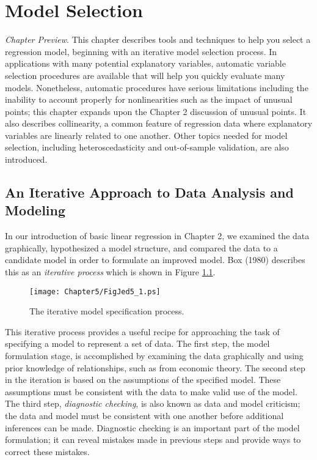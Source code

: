 \setcounter{chapter}{4}

\chapter{Model Selection}

{\small \textit{Chapter Preview}. This chapter describes tools and
techniques to help you select a regression model, beginning with an
iterative model selection process. In applications with many
potential explanatory variables, automatic variable selection
procedures are available that will help you quickly evaluate many
models. Nonetheless, automatic procedures have serious limitations
including the inability to account properly for nonlinearities such
as the impact of unusual points; this chapter expands upon the
Chapter 2 discussion of unusual points. It also describes
collinearity, a common feature of regression data where explanatory
variables are linearly related to one another. Other topics needed
for model selection, including heteroscedasticity and out-of-sample
validation, are also introduced.}

\section{An Iterative Approach to Data Analysis and
Modeling}\label{S5:Iterative}

In our introduction of basic linear regression in Chapter 2, we
examined the data graphically, hypothesized a model structure, and
compared the data to a candidate model in order to formulate an
improved model. Box (1980) describes this as an \emph{iterative
process} which is shown in Figure \ref{F5:Iterative}.

 \begin{figure}[htp]
    \texttt{[image: Chapter5/FigJed5\_1.ps]}
    \caption{\label{F5:Iterative} \small The iterative model specification process.}
\end{figure}


This iterative process provides a useful recipe for approaching the
task of specifying a model to represent a set of data. The first
step, the model formulation stage, is accomplished by examining the
data graphically and using prior knowledge of relationships, such as
from economic theory. The second step in the iteration is based on
the assumptions of the specified model. These assumptions must be
consistent with the data to make valid use of the model. The third
step, \emph{diagnostic checking}, is also known as data and model
criticism; the data and model must be consistent with one another
before additional inferences can be made. Diagnostic checking is an
important part of the model formulation; it can reveal mistakes made
in previous steps and provide ways to correct these mistakes.

